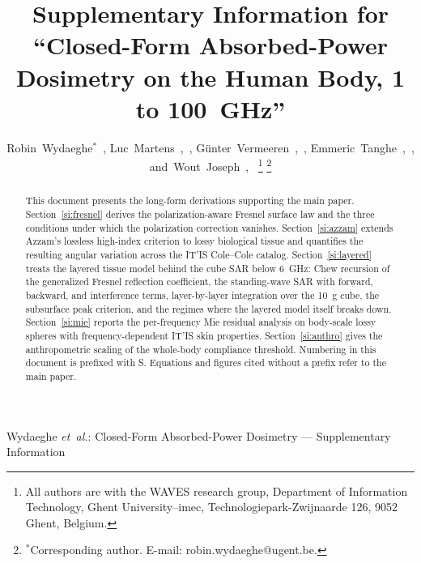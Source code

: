 \documentclass[journal,twocolumn,10pt]{IEEEtran}
\theoremstyle{plain}
\theoremstyle{remark}
\begin{document}
\title{Supplementary Information for\\
``Closed-Form Absorbed-Power Dosimetry on the Human Body, 1 to 100~GHz''}

\author{Robin~Wydaeghe$^{*}$~,
  Luc~Martens~,~,
  G\"unter~Vermeeren~,~,
  Emmeric~Tanghe~,~,
  and~Wout~Joseph~,~%
  \thanks{All authors are with the WAVES research group, Department of
  Information Technology, Ghent University--imec, Technologiepark-Zwijnaarde
  126, 9052 Ghent, Belgium.}%
  \thanks{$^{*}$Corresponding author. E-mail: robin.wydaeghe@ugent.be.}}

%
{Wydaeghe \MakeLowercase{\textit{et~al.}}: Closed-Form
Absorbed-Power Dosimetry --- Supplementary Information}

\maketitle

\IEEEpeerreviewmaketitle

\begin{abstract}
This document presents the long-form derivations supporting the main
paper. Section~\ref{si:fresnel} derives the polarization-aware
Fresnel surface law and the three conditions under which the
polarization correction vanishes. Section~\ref{si:azzam} extends
Azzam's lossless high-index criterion to lossy biological tissue and
quantifies the resulting angular variation across the IT'IS Cole--Cole
catalog. Section~\ref{si:layered} treats the layered tissue model
behind the cube SAR below 6~GHz: Chew recursion of the generalized
Fresnel reflection coefficient, the standing-wave SAR with forward,
backward, and interference terms, layer-by-layer integration over the
10~g cube, the subsurface peak criterion, and the regimes where
the layered model itself breaks down. Section~\ref{si:mie} reports
the per-frequency Mie residual analysis on body-scale lossy spheres
with frequency-dependent IT'IS skin properties. Section~\ref{si:anthro}
gives the anthropometric scaling of the whole-body compliance
threshold. Numbering in this document is prefixed with S. Equations
and figures cited without a prefix refer to the main paper.
\end{abstract}
\end{document}
